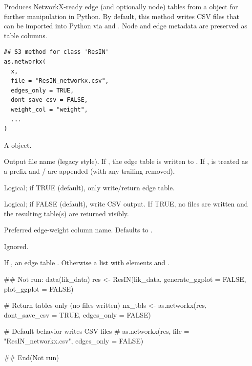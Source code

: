 \documentclass[a4paper]{book}
\begin{document}
%
\begin{Description}
Produces NetworkX-ready edge (and optionally node) tables
from a  object for further manipulation in Python.
By default, this method writes CSV files that can be imported into Python
via  and . Node and edge metadata are preserved as
table columns.
\end{Description}
%
\begin{Usage}
\begin{verbatim}
## S3 method for class 'ResIN'
as.networkx(
  x,
  file = "ResIN_networkx.csv",
  edges_only = TRUE,
  dont_save_csv = FALSE,
  weight_col = "weight",
  ...
)
\end{verbatim}
\end{Usage}
%
\begin{Arguments}
\begin{ldescription}
\item[\code{x}] A  object.

\item[\code{file}] Output file name (legacy style). If ,
the edge table is written to . If ,
 is treated as a prefix and  /
 are appended (with any trailing  removed).

\item[\code{edges\_only}] Logical; if TRUE (default), only write/return edge table.

\item[\code{dont\_save\_csv}] Logical; if FALSE (default), write CSV output. If TRUE,
no files are written and the resulting table(s) are returned visibly.

\item[\code{weight\_col}] Preferred edge-weight column name. Defaults to .

\item[\code{...}] Ignored.
\end{ldescription}
\end{Arguments}
%
\begin{Value}
If , an edge table .
Otherwise a list with elements  and .
\end{Value}
%
\begin{Examples}
\begin{ExampleCode}
## Not run: 
data(lik_data)
res <- ResIN(lik_data, generate_ggplot = FALSE, plot_ggplot = FALSE)

# Return tables only (no files written)
nx_tbls <- as.networkx(res, dont_save_csv = TRUE, edges_only = FALSE)

# Default behavior writes CSV files
# as.networkx(res, file = "ResIN_networkx.csv", edges_only = FALSE)

## End(Not run)

\end{ExampleCode}
\end{Examples}
\end{document}

